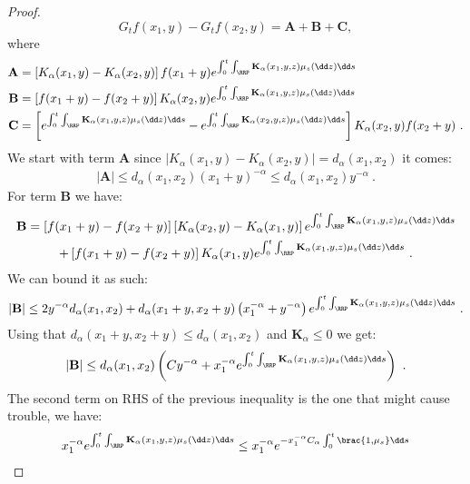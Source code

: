 \begin{proof}
        \[G_tf(x_1,y) - G_tf(x_2,y) = \mathbf{A} + \mathbf{B} + \mathbf{C},\]
    where
    \begin{align*}
        \mathbf{A} &= \left[K_\alpha(x_1,y) - K_\alpha(x_2,y)\right]f(x_1 + y) e^{\int_0^t\int_{\RRP} \mathbf{K}_\alpha(x_1,y,z)\mu_s(\dd z) \dd s} \\
        \mathbf{B} &= \left[f(x_1 + y) - f(x_2 + y)\right] K_\alpha(x_2,y)e^{\int_0^t\int_{\RRP} \mathbf{K}_\alpha(x_1,y,z)\mu_s(\dd z) \dd s} \\
        \mathbf{C} &= \left[e^{\int_0^t\int_{\RRP}\mathbf{K}_\alpha(x_1,y,z)\mu_s(\dd z) \dd s} -e^{\int_0^t\int_{\RRP} \mathbf{K}_\alpha(x_2,y,z)\mu_s(\dd z) \dd s}\right] K_\alpha(x_2,y)f(x_2+y)\ .
    \end{align*}
    We start with term $\mathbf{A}$ since $\left|K_\alpha(x_1,y) - K_\alpha(x_2,y) \right|= d_\alpha(x_1,x_2)$ it comes:
    \begin{align*}
       |\mathbf{A}| \leq d_\alpha(x_1,x_2) (x_1 + y)^{-\alpha} \leq d_\alpha(x_1,x_2) y^{-\alpha} \ . 
    \end{align*}
    For term $\mathbf{B}$ we have:
    \begin{multline*}
        \mathbf{B} = \left[f(x_1 + y) - f(x_2 + y)\right] \left[ K_\alpha(x_2,y) - K_\alpha(x_1,y)\right]e^{\int_0^t\int_{\RRP} \mathbf{K}_\alpha(x_1,y,z)\mu_s(\dd z) \dd s} \\
        + \left[f(x_1 + y) - f(x_2 + y)\right]K_\alpha(x_1,y)e^{\int_0^t\int_{\RRP} \mathbf{K}_\alpha(x_1,y,z)\mu_s(\dd z) \dd s}\ .
    \end{multline*}
    We can bound it as such:
    \begin{align*}
        |\mathbf{B}| \leq 2y^{-\alpha} d_\alpha(x_1,x_2) +d_\alpha(x_1+y,x_2+y) \left(x_1^{-\alpha} + y^{-\alpha}\right)e^{\int_0^t\int_{\RRP} \mathbf{K}_\alpha(x_1,y,z)\mu_s(\dd z) \dd s}\ .
    \end{align*}
    Using that $d_\alpha(x_1+y,x_2+y) \leq d_\alpha(x_1,x_2)$ and $\mathbf{K}_\alpha \leq 0$ we get:
    \begin{align*}
        |\mathbf{B}| \leq  d_\alpha(x_1,x_2) \left(Cy^{-\alpha} + x_1^{-\alpha}e^{\int_0^t\int_{\RRP} \mathbf{K}_\alpha(x_1,y,z)\mu_s(\dd z) \dd s} \right)\ .
    \end{align*}
    The second term on RHS of the previous inequality is the one that might cause trouble, we have:
    \begin{align*}
        x_1^{-\alpha}e^{\int_0^t\int_{\RRP} \mathbf{K}_\alpha(x_1,y,z)\mu_s(\dd z) \dd s} 
        &\leq x_1^{-\alpha}e^{-x_1^{-\alpha}C_\alpha\int_0^t\brac{1,\mu_s} \dd s} \\

\end{align*}
\end{proof}
